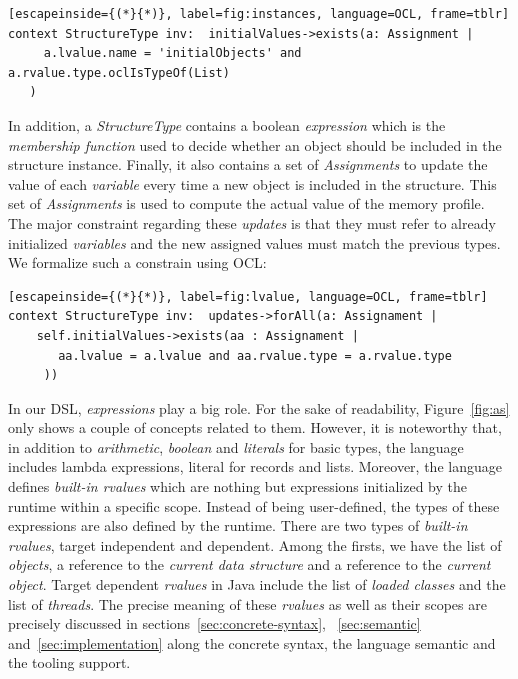 \begin{lstlisting}[escapeinside={(*}{*)}, label=fig:instances, language=OCL, frame=tblr]
context StructureType inv:  initialValues->exists(a: Assignment | 
     a.lvalue.name = 'initialObjects' and a.rvalue.type.oclIsTypeOf(List)
   ) 
\end{lstlisting}

In addition, a \textit{StructureType} contains a boolean \textit{expression} which is the \textit{membership function} used to decide whether an object should be included in the structure instance.
Finally, it also contains a set of \textit{Assignments} to update the value of each \textit{variable} every time a new object is included in the structure.
This set of \textit{Assignments} is used to compute the actual value of the memory profile.
The major constraint regarding these \textit{updates} is that they must refer to already initialized \textit{variables} and the new assigned values must match the previous types.
We formalize such a constrain using OCL:

\begin{lstlisting}[escapeinside={(*}{*)}, label=fig:lvalue, language=OCL, frame=tblr]
context StructureType inv:  updates->forAll(a: Assignament | 
    self.initialValues->exists(aa : Assignament | 
       aa.lvalue = a.lvalue and aa.rvalue.type = a.rvalue.type
     ))
\end{lstlisting}

In our DSL, \textit{expressions} play a big role.
For the sake of readability, Figure~\ref{fig:as} only shows a couple of concepts related to them.
However, it is noteworthy that, in addition to \textit{arithmetic}, \textit{boolean} and \textit{literals} for basic types, the language includes lambda expressions, literal for records and lists.
Moreover, the language defines \textit{built-in rvalues} which are nothing but expressions initialized by the runtime within a specific scope.
Instead of being user-defined, the types of these expressions are also defined by the runtime.
There are two types of \textit{built-in rvalues}, target independent and dependent.
Among the firsts, we have the list of  \textit{objects}, a reference to the \textit{current data structure} and a reference to the \textit{current object}.
Target dependent \textit{rvalues} in Java include the list of \textit{loaded classes} and the list of \textit{threads}.
The precise meaning of these \textit{rvalues} as well as their scopes are precisely discussed in sections~\ref{sec:concrete-syntax}, ~\ref{sec:semantic} and~\ref{sec:implementation} along the concrete syntax, the language semantic and the tooling support.

